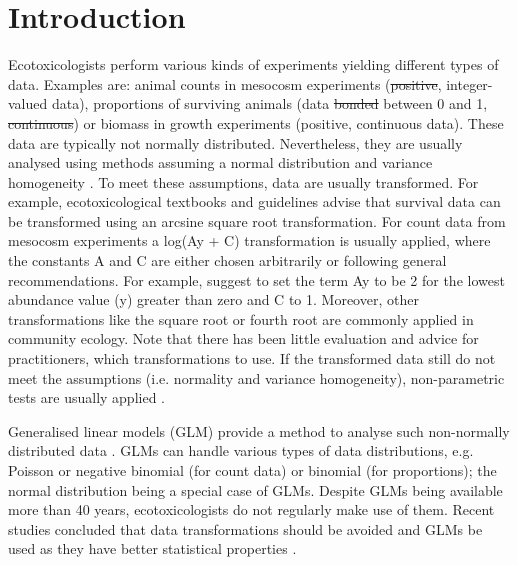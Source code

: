 \documentclass[twocolumn, natbib]{svjour3}
\providecommand{\DIFadd}[1]{{\protect\color{blue}\uwave{#1}}} %
\providecommand{\DIFdel}[1]{{\protect\color{red}\sout{#1}}}                      %
\providecommand{\DIFaddbegin}{} %
\providecommand{\DIFaddend}{} %
\providecommand{\DIFdelbegin}{} %
\providecommand{\DIFdelend}{} %
\begin{document}
\section{Introduction}
\label{sec:intro}
Ecotoxicologists perform various kinds of experiments yielding different types of data.
Examples are: animal counts in mesocosm experiments (\DIFdelbegin \DIFdel{positive}\DIFdelend \DIFaddbegin \DIFadd{non-negative}\DIFaddend , integer-valued data), proportions of surviving animals (data \DIFdelbegin \DIFdel{bonded }\DIFdelend \DIFaddbegin \DIFadd{bounded }\DIFaddend between 0 and 1, \DIFdelbegin \DIFdel{continuous}\DIFdelend \DIFaddbegin \DIFadd{discrete}\DIFaddend ) or biomass in growth experiments (positive, continuous data).
These data are typically not normally distributed. 
Nevertheless, they are usually analysed using methods assuming a normal distribution and variance homogeneity \citep{wang_making_2011}. 
To meet these assumptions, data are usually transformed.
For example, ecotoxicological textbooks \citep{newman_quantitative_2012} and guidelines \citep{epa_methods_2002,oecd_current_2006} advise that survival data can be transformed using an arcsine square root transformation. 
For count data from mesocosm experiments a log(Ay + C) transformation is usually applied, where the constants A and C are either chosen arbitrarily or following general recommendations. 
For example, \citet{van_den_brink_impact_2000} suggest to set the term Ay to be 2 for the lowest abundance value (y) greater than zero and C to 1. 
Moreover, other transformations like the square root or fourth root are commonly applied in community ecology.
Note that there has been little evaluation and advice for practitioners, which transformations to use.
If the transformed data still do not meet the assumptions (i.e. normality and variance homogeneity), non-parametric tests are usually applied \citep{wang_making_2011}.

Generalised linear models (GLM) provide a method to analyse such non-normally distributed data \citep{nelder_generalized_1972}.
GLMs can handle various types of data distributions, e.g. Poisson or negative binomial (for count data) or binomial (for proportions); the normal distribution being a special case of GLMs.
Despite GLMs being available more than 40 years, ecotoxicologists do not regularly make use of them.
Recent studies concluded that data transformations should be avoided and GLMs be used as they have better statistical properties \DIFdelbegin %
\DIFdelend \DIFaddbegin \citep{ohara_not_2010, warton_arcsine_2011,warton_many_2005}\DIFaddend . 
\end{document}
